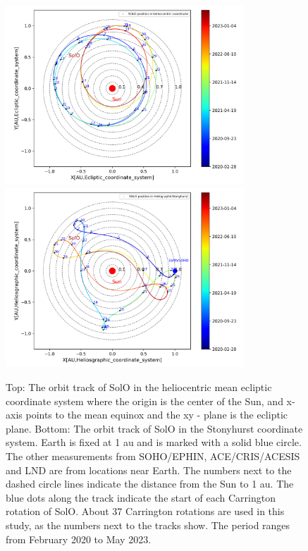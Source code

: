 \begin{figure}
    \centering
    \includegraphics[width=0.8\textwidth]{images/ACR/SOLO_orbit_track_helioscentric_3.png}
    \includegraphics[width = 0.8\textwidth]{images/ACR/SOLO_orbit_stonyhurst_3.png}
    \caption[Orbit track of \ac{SolO}]{Top: The orbit track of \ac{SolO} in the heliocentric mean ecliptic coordinate system where the origin is the center of the Sun, and x-axis points to the mean equinox and the xy - plane is the ecliptic plane. Bottom: The orbit track of \ac{SolO} in the Stonyhurst coordinate system. Earth is fixed at 1 au and is marked with a solid blue circle. The other measurements from \acs{SOHO}/\acs{EPHIN}, \acs{ACE}/\acs{CRIS}/\acs{ACESIS} and \acs{LND} are from locations near Earth. The numbers next to the dashed circle lines indicate the distance from the Sun to 1 au.
    The blue dots along the track indicate the start of each Carrington rotation of \ac{SolO}. About 37 Carrington rotations are used in this study, as the numbers next to the tracks show. The period ranges from February 2020 to May 2023.}
    \label{fig:SOLO_orbit_track}
\end{figure}





